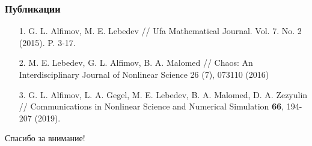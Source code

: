 \documentclass [10pt] {beamer}
\begin{document}

\begin{frame}
	\frametitle{Публикации}
	
	\begin{small}
	\begin{enumerate}
		\setlength\itemsep{10pt}
		\item[1.] G. L. Alfimov, M. E. Lebedev // Ufa Mathematical Journal. Vol. 7. No. 2 (2015). P. 3-17.
		\item[2.] M. E. Lebedev, G. L. Alfimov, B. A. Malomed // Chaos: An Interdisciplinary Journal of Nonlinear Science 26 (7), 073110 (2016)
		\item[3.] G. L. Alfimov, L. A. Gegel, M. E. Lebedev, B. A. Malomed, D. A. Zezyulin // Communications in Nonlinear Science and Numerical Simulation {\bf 66}, 194-207 (2019).
	\end{enumerate}
	\end{small}
\end{frame}

\begin{frame}
	\begin{center}
		{\Huge Спасибо за внимание!}
	\end{center}
\end{frame}
\end{document}
